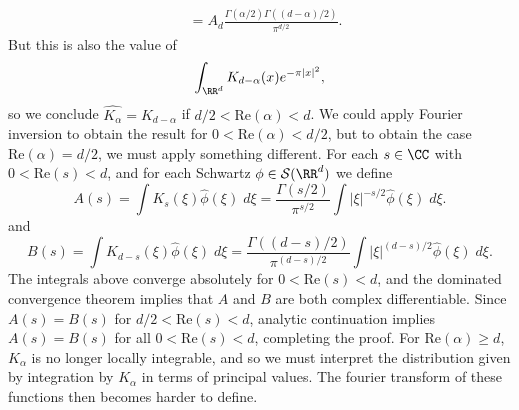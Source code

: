 \begin{example}
\begin{align*}
    &= A_d \frac{\Gamma(\alpha/2) \Gamma((d-\alpha)/2)}{\pi^{d/2}}.
  \end{align*}
  But this is also the value of
  \[ \int_{\RR^d} K_{d - \alpha}(x) e^{- \pi |x|^2}, \]
  so we conclude $\widehat{K_\alpha} = K_{d-\alpha}$ if $d/2 < \text{Re}(\alpha) < d$. We could apply Fourier inversion to obtain the result for $0 < \text{Re}(\alpha) < d/2$, but to obtain the case $\text{Re}(\alpha) = d/2$, we must apply something different. For each $s \in \CC$ with $0 < \text{Re}(s) < d$, and for each Schwartz $\phi \in \mathcal{S}(\RR^d)$ we define
  \[ A(s) = \int K_s(\xi) \widehat{\phi}(\xi)\; d\xi = \frac{\Gamma(s/2)}{\pi^{s/2}} \int |\xi|^{-s/2} \widehat{\phi}(\xi)\; d\xi. \]
  and
  \[ B(s) = \int K_{d-s}(\xi) \widehat{\phi}(\xi)\; d\xi = \frac{\Gamma((d-s)/2)}{\pi^{(d-s)/2}} \int |\xi|^{(d-s)/2} \widehat{\phi}(\xi)\; d\xi. \]
  The integrals above converge absolutely for $0 < \text{Re}(s) < d$, and the dominated convergence theorem implies that $A$ and $B$ are both complex differentiable. Since $A(s) = B(s)$ for $d/2 < \text{Re}(s) < d$, analytic continuation implies $A(s) = B(s)$ for all $0 < \text{Re}(s) < d$, completing the proof. For $\text{Re}(\alpha) \geq d$, $K_\alpha$ is no longer locally integrable, and so we must interpret the distribution given by integration by $K_\alpha$ in terms of principal values. The fourier transform of these functions then becomes harder to define.
\end{example}

